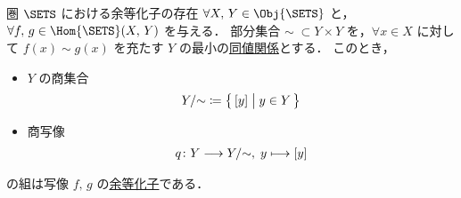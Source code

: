 \documentclass[geometry_main]{subfiles}
\begin{document}
\begin{myprop}[label=prop:coequalizer-sets]{圏 $\SETS$ における余等化子の存在}
	$\forall X,\, Y \in \Obj{\SETS}$ と，$\forall f,\, g \in \Hom{\SETS}(X,\, Y)$ を与える．
	部分集合 $\sim\; \subset Y \times Y$ を，$\forall x \in X$ に対して $f(x)\sim g(x)$ を充たす $Y$ の最小の\hyperref[ax.equiv]{同値関係}とする．
	このとき，
	\begin{itemize}
		\item $Y$ の商集合
		\begin{align}
			Y / {\sim} \coloneqq \bigl\{\, [y] \bigm| y \in Y \,\bigr\} 
		\end{align}
		\item 商写像
		\begin{align}
			q \colon Y \longrightarrow Y/{\sim},\; y \longmapsto [y]
		\end{align}
	\end{itemize}
	の組は写像 $f,\, g$ の\hyperref[def:coequalizer]{余等化子}である．
\end{myprop}
\end{document}
